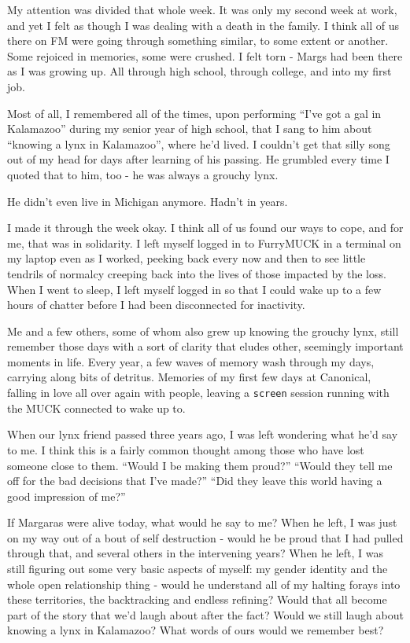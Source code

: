 My attention was divided that whole week. It was only my second week at
work, and yet I felt as though I was dealing with a death in the family.
I think all of us there on FM were going through something similar, to
some extent or another. Some rejoiced in memories, some were crushed. I
felt torn - Margs had been there as I was growing up. All through high
school, through college, and into my first job.

Most of all, I remembered all of the times, upon performing ``I've got a
gal in Kalamazoo'' during my senior year of high school, that I sang to
him about ``knowing a lynx in Kalamazoo'', where he'd lived. I couldn't
get that silly song out of my head for days after learning of his
passing. He grumbled every time I quoted that to him, too - he was
always a grouchy lynx.

He didn't even live in Michigan anymore. Hadn't in years.

I made it through the week okay. I think all of us found our ways to
cope, and for me, that was in solidarity. I left myself logged in to
FurryMUCK in a terminal on my laptop even as I worked, peeking back
every now and then to see little tendrils of normalcy creeping back into
the lives of those impacted by the loss. When I went to sleep, I left
myself logged in so that I could wake up to a few hours of chatter
before I had been disconnected for inactivity.

Me and a few others, some of whom also grew up knowing the grouchy lynx,
still remember those days with a sort of clarity that eludes other,
seemingly important moments in life. Every year, a few waves of memory
wash through my days, carrying along bits of detritus. Memories of my
first few days at Canonical, falling in love all over again with people,
leaving a \texttt{screen} session running with the MUCK connected to
wake up to.

When our lynx friend passed three years ago, I was left wondering what
he'd say to me. I think this is a fairly common thought among those who
have lost someone close to them. ``Would I be making them proud?''
``Would they tell me off for the bad decisions that I've made?'' ``Did
they leave this world having a good impression of me?''

If Margaras were alive today, what would he say to me? When he left, I
was just on my way out of a bout of self destruction - would he be proud
that I had pulled through that, and several others in the intervening
years? When he left, I was still figuring out some very basic aspects of
myself: my gender identity and the whole open relationship thing - would
he understand all of my halting forays into these territories, the
backtracking and endless refining? Would that all become part of the
story that we'd laugh about after the fact? Would we still laugh about
knowing a lynx in Kalamazoo? What words of ours would we remember best?

